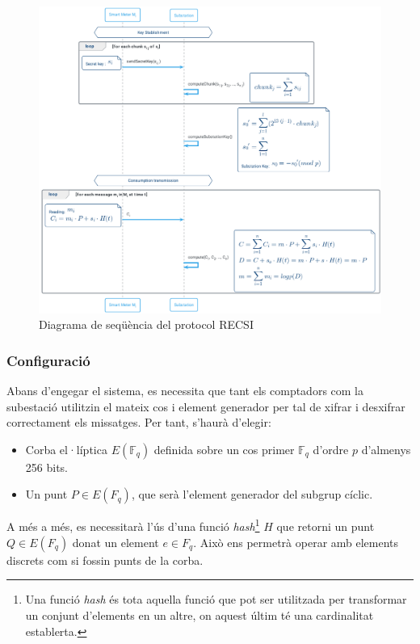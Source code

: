 \documentclass{article}
\begin{document}
\begin{figure}[H]
	\centering
	\includegraphics[width=16cm]{umls/recsi.png}
	\caption{Diagrama de seqüència del protocol RECSI}
\end{figure}
\subsubsection{Configuració}\label{sec:configuracio-recsi}
Abans d'engegar el sistema, es necessita que tant els comptadors com la subestació utilitzin el mateix cos i element generador per tal de xifrar i desxifrar correctament els missatges. Per tant, s'haurà d'elegir:
\begin{itemize}
	\item Corba el·líptica $E(\mathbb{F}_q)$ definida sobre un cos primer $\mathbb{F}_q$ d'ordre $p$ d'almenys 256 bits.
	\item Un punt $P \in E(F_q)$, que serà l'element generador del subgrup cíclic.
\end{itemize}
A més a més, es necessitarà l'ús d'una funció \textit{hash}\footnote{
Una funció \textit{hash} és tota aquella funció que pot ser utilitzada per transformar un conjunt d'elements en un altre, on aquest últim té una cardinalitat establerta.
}
$H$ que retorni un punt $Q \in E(F_q)$ donat un element $e \in F_q$. Això ens permetrà operar amb elements discrets com si fossin punts de la corba. 
\end{document}
